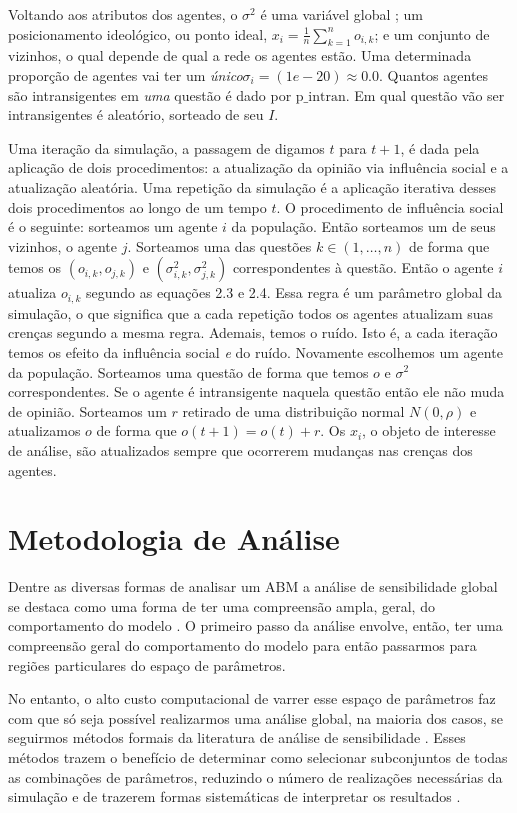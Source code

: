 Voltando aos atributos dos agentes, o \(\sigma^2\) é uma variável global ; um
posicionamento ideológico, ou ponto ideal, \(x_i = \frac{1}{n} \sum_{k = 1}^n
o_{i,k} \); e um conjunto de vizinhos, o qual depende de qual a rede os agentes
estão. Uma determinada proporção de agentes vai ter um \textit{único}\(\sigma_i =
(1e-20 ) \approx 0.0 \). Quantos agentes são intransigentes em \textit{uma} questão é
dado por \(\text{p\_intran}\). Em qual questão vão ser intransigentes é
aleatório, sorteado de seu \(I\).

Uma iteração da simulação, a passagem de digamos \(t\) para \(t+1\), é dada pela
aplicação de dois procedimentos: a atualização da opinião via influência social
e a atualização aleatória. Uma repetição da simulação é a aplicação iterativa
desses dois procedimentos ao longo de um tempo \(t \). O procedimento de
influência social é o seguinte: sorteamos um agente \(i\) da população. Então
sorteamos um de seus vizinhos, o agente \(j\). Sorteamos uma das questões \(k \in
(1,\ldots,n)\) de forma que temos os \((o_{i,k},o_{j,k})\) e
\((\sigma_{i,k}^2,\sigma_{j,k}^2)\) correspondentes à questão. Então o agente \(i\)
atualiza \(o_{i,k}\) segundo as equações 2.3 e 2.4. Essa regra é um parâmetro
global da simulação, o que significa que a cada repetição todos os agentes
atualizam suas crenças segundo a mesma regra. Ademais, temos o ruído. Isto é, a
cada iteração temos os efeito da influência social \textit{e} do ruído.
Novamente escolhemos um agente da população. Sorteamos uma questão de forma que
temos \(o\) e \(\sigma^2\) correspondentes. Se o agente é intransigente naquela
questão então ele não muda de opinião. Sorteamos um \(r\) retirado de uma
distribuição normal \(N(0,\rho)\) e atualizamos \(o\) de forma que \(o(t+1) = o(t)
+ r\). Os \(x_i\), o objeto de interesse de análise, são atualizados sempre que
ocorrerem mudanças nas crenças dos agentes.

\section{Metodologia de Análise}

Dentre as diversas formas de analisar um ABM a análise de sensibilidade global
se destaca como uma forma de ter uma compreensão ampla, geral, do comportamento
do modelo \cite{north2007managing}. O primeiro passo da análise envolve, então,
 ter uma compreensão geral do comportamento do modelo para então passarmos
para regiões particulares do espaço de parâmetros.

No entanto, o alto custo computacional de varrer esse espaço de parâmetros faz com
que só seja possível realizarmos uma análise global, na maioria dos casos, se
seguirmos métodos formais da literatura de análise de sensibilidade
\cite{railsback2012agent}. Esses métodos trazem o benefício de determinar como
selecionar subconjuntos de todas as combinações de parâmetros, reduzindo o
número de realizações necessárias da simulação e de trazerem formas sistemáticas
de interpretar os resultados \cite{railsback2012agent}.

